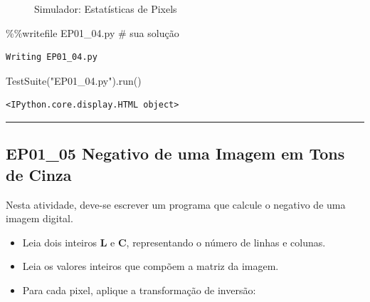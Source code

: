 \documentclass[
  portuguese,
  letterpaper,
  openany,
  oneside,
  12pt,
  a4paper]{book}
\newenvironment{Shaded}{\begin{snugshade}}{\end{snugshade}}
\newcommand{\CommentTok}[1]{\textcolor[rgb]{0.37,0.37,0.37}{#1}}
\newcommand{\NormalTok}[1]{\textcolor[rgb]{0.00,0.23,0.31}{#1}}
\newcommand{\OperatorTok}[1]{\textcolor[rgb]{0.37,0.37,0.37}{#1}}
\newcommand{\StringTok}[1]{\textcolor[rgb]{0.13,0.47,0.30}{#1}}
\providecommand{\tightlist}{%
  \setlength{\itemsep}{0pt}\setlength{\parskip}{0pt}}
\begin{document}
\begin{figure}


\caption{\label{fig-01-estatisticas-pixels}Simulador: Estatísticas de
Pixels}

\end{figure}%

\begin{Shaded}
\begin{Highlighting}[]
\OperatorTok{\%\%}\NormalTok{writefile EP01\_04.py}
\CommentTok{\# sua solução}
\end{Highlighting}
\end{Shaded}

\begin{verbatim}
Writing EP01_04.py
\end{verbatim}

\begin{Shaded}
\begin{Highlighting}[]
\NormalTok{TestSuite(}\StringTok{"EP01\_04.py"}\NormalTok{).run()}
\end{Highlighting}
\end{Shaded}

\begin{verbatim}
<IPython.core.display.HTML object>
\end{verbatim}

\begin{center}\rule{0.5\linewidth}{0.5pt}\end{center}

\subsection{\texorpdfstring{EP01\_05
 Negativo de uma Imagem em Tons de
Cinza}{EP01\_05  Negativo de uma Imagem em Tons de Cinza}}\label{ep01_05-negativo-de-uma-imagem-em-tons-de-cinza}

Nesta atividade, deve-se escrever um programa que calcule o negativo de
uma imagem digital.

\begin{itemize}
\tightlist
\item
  Leia dois inteiros \textbf{L} e \textbf{C}, representando o número de
  linhas e colunas.
\item
  Leia os valores inteiros que compõem a matriz da imagem.
\item
  Para cada pixel, aplique a transformação de inversão:
\end{itemize}
\end{document}

